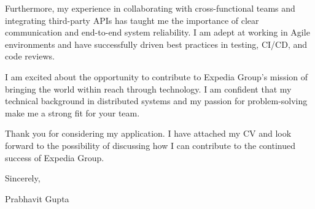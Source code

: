 \documentclass[11pt,a4paper]{article}
\begin{document}
\vspace{10pt}

\noindent
Furthermore, my experience in collaborating with cross-functional teams and integrating third-party APIs has taught me the importance of clear communication and end-to-end system reliability. I am adept at working in Agile environments and have successfully driven best practices in testing, CI/CD, and code reviews. 

\vspace{10pt}

\noindent
I am excited about the opportunity to contribute to Expedia Group's mission of bringing the world within reach through technology. I am confident that my technical background in distributed systems and my passion for problem-solving make me a strong fit for your team.

\vspace{10pt}

\noindent
Thank you for considering my application. I have attached my CV and look forward to the possibility of discussing how I can contribute to the continued success of Expedia Group.

\vspace{15pt}

\noindent
Sincerely,

\vspace{10pt}

\noindent
Prabhavit Gupta
\end{document}
